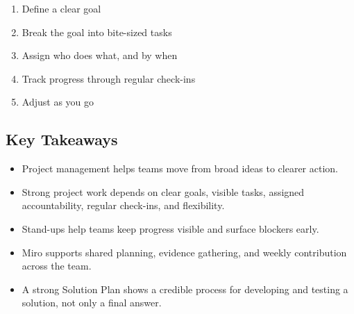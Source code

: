 \documentclass{report}
\begin{document}
		\begin{enumerate}
			\item Define a clear goal
			\item Break the goal into bite-sized tasks
			\item Assign who does what, and by when
			\item Track progress through regular check-ins
			\item Adjust as you go
		\end{enumerate}

		\subsection{Key Takeaways}

			\begin{itemize}
				\item Project management helps teams move from broad ideas to clearer action.
				\item Strong project work depends on clear goals, visible tasks, assigned accountability, regular check-ins, and flexibility.
				\item Stand-ups help teams keep progress visible and surface blockers early.
				\item Miro supports shared planning, evidence gathering, and weekly contribution across the team.
				\item A strong Solution Plan shows a credible process for developing and testing a solution, not only a final answer.
			\end{itemize}
\end{document}
